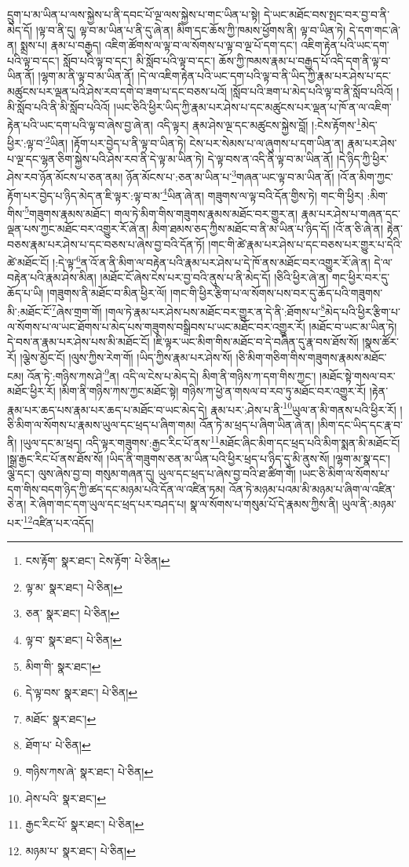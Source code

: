 དྲུག་པ་མ་ཡིན་པ་ལས་སྐྱེས་པ་ནི་དབང་པོ་ལྔ་ལས་སྐྱེས་པ་གང་ཡིན་པ་སྟེ། དེ་ཡང་མཐོང་བས་སྤང་བར་བྱ་བ་ནི་མེད་དོ། །ལྟ་བ་ནི་དུ། ལྟ་བ་མ་ཡིན་པ་ནི་དུ་ཞེ་ན། མིག་དང་ཆོས་ཀྱི་ཁམས་ཕྱོགས་ནི། ལྟ་བ་ཡིན་ཏེ། དེ་དག་གང་ཞེ་ན། སྨྲས་པ། རྣམ་པ་བརྒྱད། འཇིག་ཚོགས་ལ་ལྟ་བ་ལ་སོགས་པ་ལྟ་བ་ལྔ་པོ་དག་དང་། འཇིག་རྟེན་པའི་ཡང་དག་པའི་ལྟ་བ་དང་། སློབ་པའི་ལྟ་བ་དང་། མི་སློབ་པའི་ལྟ་བ་དང་། ཆོས་ཀྱི་ཁམས་རྣམ་པ་བརྒྱད་པོ་འདི་དག་ནི་ལྟ་བ་ཡིན་ནོ། །ལྷག་མ་ནི་ལྟ་བ་མ་ཡིན་ནོ། །དེ་ལ་འཇིག་རྟེན་པའི་ཡང་དག་པའི་ལྟ་བ་ནི་ཡིད་ཀྱི་རྣམ་པར་ཤེས་པ་དང་མཚུངས་པར་ལྡན་པའི་ཤེས་རབ་དགེ་བ་ཟག་པ་དང་བཅས་པའོ། །སློབ་པའི་ཟག་པ་མེད་པའི་ལྟ་བ་ནི་སློབ་པའིའོ། །མི་སློབ་པའི་ནི་མི་སློབ་པའིའོ། །ཡང་ཅིའི་ཕྱིར་ཡིད་ཀྱི་རྣམ་པར་ཤེས་པ་དང་མཚུངས་པར་ལྡན་པ་ཁོ་ན་ལ་འཇིག་རྟེན་པའི་ཡང་དག་པའི་ལྟ་བ་ཞེས་བྱ་ཞེ་ན། འདི་ལྟར། རྣམ་ཤེས་ལྔ་དང་མཚུངས་སྐྱེས་བློ། །:ངེས་རྟོགས་\footnote{ངས་རྟོག་  སྣར་ཐང་། ངེས་རྟོག་  པེ་ཅིན། }མེད་ཕྱིར་:ལྟ་བ་\footnote{ལྟ་མ་  སྣར་ཐང་།  པེ་ཅིན། }ཡིན། །རྟོག་པར་བྱེད་པ་ནི་ལྟ་བ་ཡིན་ཏེ། ངེས་པར་སེམས་པ་ལ་ཞུགས་པ་དག་ཡིན་ན། རྣམ་པར་ཤེས་པ་ལྔ་དང་ལྷན་ཅིག་སྐྱེས་པའི་ཤེས་རབ་ནི་དེ་ལྟ་མ་ཡིན་ཏེ། དེ་ལྟ་བས་ན་འདི་ནི་ལྟ་བ་མ་ཡིན་ནོ། །དེ་ཉིད་ཀྱི་ཕྱིར་ཤེས་རབ་ཉོན་མོངས་པ་ཅན་ནམ། ཉོན་མོངས་པ་:ཅན་མ་ཡིན་པ་\footnote{ཅན་  སྣར་ཐང་།  པེ་ཅིན། }གཞན་ཡང་ལྟ་བ་མ་ཡིན་ནོ། །འོ་ན་མིག་ཀྱང་རྟོག་པར་བྱེད་པ་ཉིད་མེད་ན་ཇི་ལྟར་:ལྟ་བ་མ་\footnote{ལྟ་བ་  སྣར་ཐང་།  པེ་ཅིན། }ཡིན་ཞེ་ན། གཟུགས་ལ་ལྟ་བའི་དོན་གྱིས་ཏེ། གང་གི་ཕྱིར། :མིག་གིས་\footnote{མིག་གི་  སྣར་ཐང་། }གཟུགས་རྣམས་མཐོང་། གལ་ཏེ་མིག་གིས་གཟུགས་རྣམས་མཐོང་བར་གྱུར་ན། རྣམ་པར་ཤེས་པ་གཞན་དང་ལྡན་པས་ཀྱང་མཐོང་བར་འགྱུར་རོ་ཞེ་ན། མིག་ཐམས་ཅད་ཀྱིས་མཐོང་བ་ནི་མ་ཡིན་པ་ཉིད་དོ། །འོ་ན་ཅི་ཞེ་ན། རྟེན་བཅས་རྣམ་པར་ཤེས་པ་དང་བཅས་པ་ཞེས་བྱ་བའི་དོན་ཏོ། །གང་གི་ཚེ་རྣམ་པར་ཤེས་པ་དང་བཅས་པར་གྱུར་པ་དེའི་ཚེ་མཐོང་ངོ། །:དེ་ལྟ་\footnote{དེ་ལྟ་བས་  སྣར་ཐང་།  པེ་ཅིན། }ན་འོ་ན་ནི་མིག་ལ་བརྟེན་པའི་རྣམ་པར་ཤེས་པ་དེ་ཁོ་ནས་མཐོང་བར་འགྱུར་རོ་ཞེ་ན། དེ་ལ་བརྟེན་པའི་རྣམ་ཤེས་མིན། །མཐོང་ངོ་ཞེས་ངེས་པར་བྱ་བའི་ནུས་པ་ནི་མེད་དོ། །ཅིའི་ཕྱིར་ཞེ་ན། གང་ཕྱིར་བར་དུ་ཆོད་པ་ཡི། །གཟུགས་ནི་མཐོང་བ་མིན་ཕྱིར་ལོ། །གང་གི་ཕྱིར་རྩིག་པ་ལ་སོགས་པས་བར་དུ་ཆོད་པའི་གཟུགས་མི་:མཐོང་ངོ་\footnote{མཐོང་  སྣར་ཐང་། }ཞེས་གྲག་གོ། །གལ་ཏེ་རྣམ་པར་ཤེས་པས་མཐོང་བར་གྱུར་ན་དེ་ནི་:ཐོགས་པ་\footnote{ཐོག་པ་  པེ་ཅིན། }མེད་པའི་ཕྱིར་རྩིག་པ་ལ་སོགས་པ་ལ་ཡང་ཐོགས་པ་མེད་པས་གཟུགས་བསྒྲིབས་པ་ཡང་མཐོང་བར་འགྱུར་རོ། །མཐོང་བ་ཡང་མ་ཡིན་ཏེ། དེ་བས་ན་རྣམ་པར་ཤེས་པས་མི་མཐོང་ངོ། །ཇི་ལྟར་ཡང་མིག་གིས་མཐོང་བ་དེ་བཞིན་དུ་རྣ་བས་ཐོས་སོ། །སྣས་ཚོར་རོ། །ལྕེས་མྱོང་ངོ། །ལུས་ཀྱིས་རེག་གོ། །ཡིད་ཀྱིས་རྣམ་པར་ཤེས་སོ། །ཅི་མིག་གཅིག་གིས་གཟུགས་རྣམས་མཐོང་ངམ། འོན་ཏེ་:གཉིས་ཀས་ཤེ་\footnote{གཉིས་ཀས་ཞེ་  སྣར་ཐང་།  པེ་ཅིན། }ན། འདི་ལ་ངེས་པ་མེད་དེ། མིག་ནི་གཉིས་ཀ་དག་གིས་ཀྱང་། །མཐོང་སྟེ་གསལ་བར་མཐོང་ཕྱིར་རོ། །མིག་ནི་གཉིས་ཀས་ཀྱང་མཐོང་སྟེ། གཉིས་ཀ་ཕྱེ་ན་གསལ་བ་རབ་ཏུ་མཐོང་བར་འགྱུར་རོ། །རྟེན་རྣམ་པར་ཆད་པས་རྣམ་པར་ཆད་པ་མཐོང་བ་ཡང་མེད་དེ། རྣམ་པར་:ཤེས་པ་ནི་\footnote{ཤེས་པའི་  སྣར་ཐང་། }ཡུལ་ན་མི་གནས་པའི་ཕྱིར་རོ། །ཅི་མིག་ལ་སོགས་པ་རྣམས་ཡུལ་དང་ཕྲད་པ་ཞིག་གམ། འོན་ཏེ་མ་ཕྲད་པ་ཞིག་ཡིན་ཞེ་ན། །མིག་དང་ཡིད་དང་རྣ་བ་ནི། །ཡུལ་དང་མ་ཕྲད། འདི་ལྟར་གཟུགས་:རྒྱང་རིང་པོ་ནས་\footnote{རྒྱང་རིང་པོ་  སྣར་ཐང་།  པེ་ཅིན། }མཐོང་ཞིང་མིག་དང་ཕྲད་པའི་མིག་སྨན་མི་མཐོང་ངོ། །སྒྲ་རྒྱང་རིང་པོ་ནས་ཐོས་སོ། །ཡིད་ནི་གཟུགས་ཅན་མ་ཡིན་པའི་ཕྱིར་ཕྲད་པ་ཉིད་དུ་མི་ནུས་སོ། །ལྷག་མ་སྣ་དང་། ལྕེ་དང་། ལུས་ཞེས་བྱ་བ། གསུམ་གཞན་དུ། ཡུལ་དང་ཕྲད་པ་ཞེས་བྱ་བའི་ཐ་ཚིག་གོ། །ཡང་ཅི་མིག་ལ་སོགས་པ་དག་གིས་བདག་ཉིད་ཀྱི་ཚད་དང་མཉམ་པའི་དོན་ལ་འཛིན་ཏམ། འོན་ཏེ་མཉམ་པའམ་མི་མཉམ་པ་ཞིག་ལ་འཛིན་ཅེ་ན། རེ་ཞིག་གང་དག་ཡུལ་དང་ཕྲད་པར་བཤད་པ། སྣ་ལ་སོགས་པ་གསུམ་པོ་དེ་རྣམས་ཀྱིས་ནི། ཡུལ་ནི་:མཉམ་པར་\footnote{མཉམ་པ་  སྣར་ཐང་།  པེ་ཅིན། }འཛིན་པར་འདོད། 